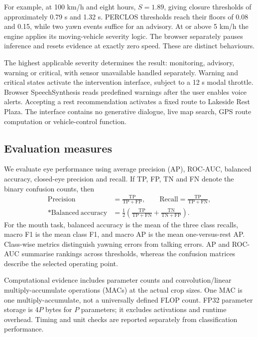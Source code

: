 \documentclass[pdflatex,sn-mathphys-num]{sn-jnl}
\begin{document}
For example, at 100 km/h and eight hours, $S=1.89$, giving closure thresholds of approximately 0.79 s and 1.32 s. PERCLOS thresholds reach their floors of 0.08 and 0.15, while two yawn events suffice for an advisory. At or above 5 km/h the engine applies its moving-vehicle severity logic. The browser separately pauses inference and resets evidence at exactly zero speed. These are distinct behaviours.

The highest applicable severity determines the result: monitoring, advisory, warning or critical, with sensor unavailable handled separately. Warning and critical states activate the intervention interface, subject to a 12 s modal throttle. Browser SpeechSynthesis reads predefined warnings after the user enables voice alerts. Accepting a rest recommendation activates a fixed route to Lakeside Rest Plaza. The interface contains no generative dialogue, live map search, GPS route computation or vehicle-control function.

\subsection{Evaluation measures}
We evaluate eye performance using average precision (AP), ROC-AUC, balanced accuracy, closed-eye precision and recall. If TP, FP, TN and FN denote the binary confusion counts, then
\begin{align}
\mathrm{Precision}&=\frac{\mathrm{TP}}{\mathrm{TP}+\mathrm{FP}},\qquad
\mathrm{Recall}=\frac{\mathrm{TP}}{\mathrm{TP}+\mathrm{FN}},\\*
\mathrm{Balanced\ accuracy}&=\tfrac12\!\left(\frac{\mathrm{TP}}{\mathrm{TP}+\mathrm{FN}}+
\frac{\mathrm{TN}}{\mathrm{TN}+\mathrm{FP}}\right).
\end{align}
For the mouth task, balanced accuracy is the mean of the three class recalls, macro F1 is the mean class F1, and macro AP is the mean one-versus-rest AP. Class-wise metrics distinguish yawning errors from talking errors. AP and ROC-AUC summarise rankings across thresholds, whereas the confusion matrices describe the selected operating point.

Computational evidence includes parameter counts and convolution/linear multiply-accumulate operations (MACs) at the actual crop sizes. One MAC is one multiply-accumulate, not a universally defined FLOP count. FP32 parameter storage is $4P$ bytes for $P$ parameters; it excludes activations and runtime overhead. Timing and unit checks are reported separately from classification performance.
\end{document}
